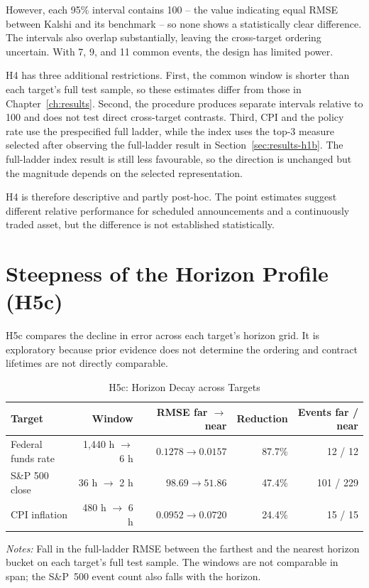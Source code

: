 \documentclass[12pt,a4paper]{report}
\newcommand{\tablenote}[1]{%
  \par\vspace{0.4em}%
  \begin{minipage}{0.9\textwidth}%
  \footnotesize\raggedright\emph{Notes:} #1%
  \end{minipage}%
}
\begin{document}
However, each 95\% interval contains 100 -- the value indicating equal RMSE between Kalshi and its benchmark -- so none shows a statistically clear difference. The intervals also overlap substantially, leaving the cross-target ordering uncertain. With 7, 9, and 11
common events, the design has limited power.

H4 has three additional restrictions. First, the common window is shorter than
each target's full test sample, so these estimates differ from those in
Chapter~\ref{ch:results}. Second, the procedure produces separate intervals
relative to 100 and does not test direct cross-target contrasts. Third, CPI and
the policy rate use the prespecified full ladder, while the index uses the
top-3 measure selected after observing the full-ladder result in
Section~\ref{sec:results-h1b}. The full-ladder index result is still less
favourable, so the direction is unchanged but the magnitude depends on the
selected representation.

H4 is therefore descriptive and partly post-hoc. The point estimates suggest
different relative performance for scheduled announcements and a continuously
traded asset, but the difference is not established statistically.

\section{Steepness of the Horizon Profile (H5c)}
\label{sec:h5c}

H5c compares the decline in error across each target's horizon grid. It is
exploratory because prior evidence does not determine the ordering and contract
lifetimes are not directly comparable.

\begin{table}[htbp]
\centering
\caption{H5c: Horizon Decay across Targets}
\label{tab:h5c}
\small
\begin{tabular}{@{}lrrrr@{}}
\toprule
Target & Window & RMSE far $\rightarrow$ near & Reduction & Events far / near \\
\midrule
Federal funds rate & 1{,}440 h $\rightarrow$ 6 h & $0.1278 \rightarrow 0.0157$ & 87.7\% & 12 / 12 \\
S\&P 500 close & 36 h $\rightarrow$ 2 h & $98.69 \rightarrow 51.86$ & 47.4\% & 101 / 229 \\
CPI inflation & 480 h $\rightarrow$ 6 h & $0.0952 \rightarrow 0.0720$ & 24.4\% & 15 / 15 \\
\bottomrule
\end{tabular}
\tablenote{Fall in the full-ladder RMSE between the farthest and the nearest
horizon bucket on each target's full test sample. The windows are not
comparable in span; the S\&P~500 event count also falls with the horizon.}
\end{table}
\end{document}
